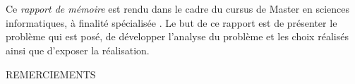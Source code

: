 \documentclass[12pt, a4paper, oneside, titlepage]{book}%
\begin{document}
\chapter*{}
Ce \emph{rapport de mémoire} est rendu dans le cadre du cursus de \og Master en sciences informatiques, à finalité spécialisée \fg. Le but de ce rapport est de présenter le problème qui est posé, de développer l'analyse du problème et les choix réalisés ainsi que d'exposer la réalisation.

\cleardoublepage
\newpage
\thispagestyle{empty}
REMERCIEMENTS



\newpage
\thispagestyle{empty}
\tableofcontents
      
\end{document}
